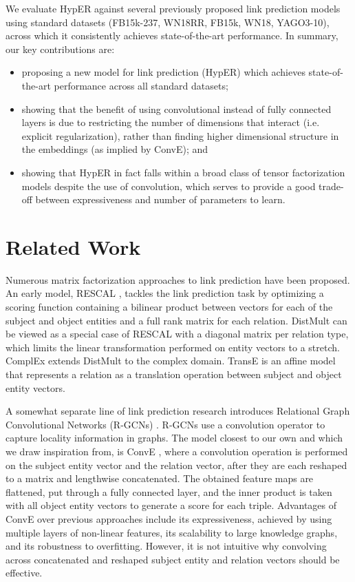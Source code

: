 \documentclass[runningheads]{llncs}
\begin{document}
We evaluate HypER against several previously proposed link prediction models using standard datasets (FB15k-237, WN18RR, FB15k, WN18, YAGO3-10), across which it consistently achieves state-of-the-art performance. In summary, our key contributions are:
\begin{itemize}
\itemsep0em
\item proposing a new model for link prediction (HypER) which achieves state-of-the-art performance across all standard datasets;
\item showing that the benefit of using convolutional instead of fully connected layers is due to restricting the number of dimensions that interact (i.e. explicit regularization), rather than finding higher dimensional structure in the embeddings (as implied by ConvE); and
\item showing that HypER in fact falls within a broad class of tensor factorization models despite the use of convolution, which serves to provide a good trade-off between expressiveness and number of parameters to learn.
\end{itemize}

\section{Related Work}

Numerous matrix factorization approaches to link prediction have been proposed. An early model, RESCAL \cite{nickel2011three}, tackles the link prediction task by optimizing a scoring function containing a bilinear product between vectors for each of the subject and object entities and a full rank matrix for each relation. DistMult \cite{yang2014embedding} can be viewed as a special case of RESCAL with a diagonal matrix per relation type, which limits the linear transformation performed on entity vectors to a stretch. ComplEx \cite{trouillon2016complex} extends DistMult to the complex domain. TransE  \cite{bordes2013translating} is an affine model that represents a relation as a translation operation between subject and object entity vectors.

A somewhat separate line of link prediction research introduces Relational Graph Convolutional Networks (R-GCNs) \cite{schlichtkrull2018modeling}. R-GCNs use a convolution operator to capture locality information in graphs. The model closest to our own and which we draw inspiration from, is ConvE \cite{dettmers2017convolutional}, where a convolution operation is performed on the subject entity vector and the relation vector, after they are each reshaped to a matrix and lengthwise concatenated. The obtained feature maps are flattened, put through a fully connected layer, and the inner product is taken with all object entity vectors to generate a score for each triple. Advantages of ConvE over previous approaches include its expressiveness, achieved by using multiple layers of non-linear features, its scalability to large knowledge graphs, and its robustness to overfitting. However, it is not intuitive why convolving across concatenated and reshaped subject entity and relation vectors should be effective. 
\end{document}
